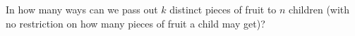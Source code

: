 \documentclass{book}
\begin{document}
\setcounter{cpjt}{88}
\addtocounter{cpjt}{-1}
\begin{activity}\label{activity-81}
\hypertarget{p-642}{}%
In how many ways can we pass out \(k\) distinct pieces of fruit to \(n\) children (with no restriction on how many pieces of fruit a child may get)?%
\par\smallskip%
\noindent\end{activity}

\clearpage
\end{document}

